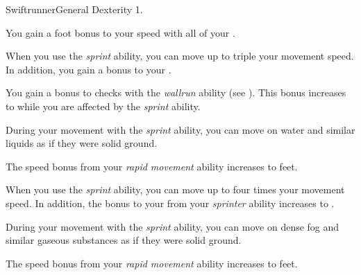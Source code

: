     \begin{feat}{Swiftrunner}{General}
        \featpre Dexterity 1.

         You gain a  foot bonus to your speed with all of your .

         When you use the \textit{sprint} ability, you can move up to triple your movement speed.
        In addition, you gain a  bonus to your .

         You gain a  bonus to checks with the \textit{wallrun} ability (see ).
        This bonus increases to  while you are affected by the \textit{sprint} ability.

         During your movement with the \textit{sprint} ability, you can move on water and similar liquids as if they were solid ground.

         The speed bonus from your \textit{rapid movement} ability increases to  feet.

         When you use the \textit{sprint} ability, you can move up to four times your movement speed.
        In addition, the bonus to your  from your \textit{sprinter} ability increases to .

         During your movement with the \textit{sprint} ability, you can move on dense fog and similar gaseous substances as if they were solid ground.

         The speed bonus from your \textit{rapid movement} ability increases to  feet.
    \end{feat}

